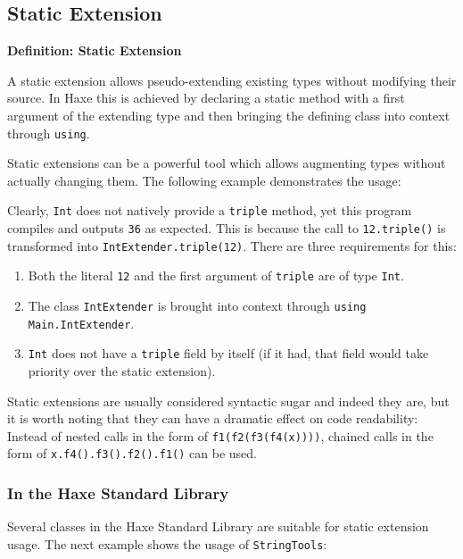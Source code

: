 \documentclass{article}
\newcommand{\type}[1]{\texttt{#1}}
\newcommand{\expr}[1]{\texttt{#1}}
\newenvironment{myshaded}
  {\def\FrameCommand{\fboxsep=\topsep\colorbox{bgcolor}}%
  \MakeFramed {\advance\hsize-\width \FrameRestore}}%
 {\endMakeFramed}
\newcommand{\define}[3][Definition]
	{\begin{myshaded}\noindent\textbf{#1: #2}\par\nobreak\noindent\ignorespaces#3\label{def:#2}\end{myshaded}}
\begin{document}
\subsection{Static Extension}
\label{Static Extension}

\define{Static Extension}{A static extension allows pseudo-extending existing types without modifying their source. In Haxe this is achieved by declaring a static method with a first argument of the extending type and then bringing the defining class into context through \expr{using}.}

Static extensions can be a powerful tool which allows augmenting types without actually changing them. The following example demonstrates the usage:



Clearly, \type{Int} does not natively provide a \expr{triple} method, yet this program compiles and outputs \expr{36} as expected. This is because the call to \expr{12.triple()} is transformed into \expr{IntExtender.triple(12)}. There are three requirements for this:

\begin{enumerate}
	\item Both the literal \expr{12} and the first argument of \expr{triple} are of type \type{Int}.
	\item The class \type{IntExtender} is brought into context through \expr{using Main.IntExtender}.
	\item \type{Int} does not have a \expr{triple} field by itself (if it had, that field would take priority over the static extension).
\end{enumerate}

Static extensions are usually considered syntactic sugar and indeed they are, but it is worth noting that they can have a dramatic effect on code readability: Instead of nested calls in the form of \expr{f1(f2(f3(f4(x))))}, chained calls in the form of \expr{x.f4().f3().f2().f1()} can be used.

\subsubsection{In the Haxe Standard Library}

Several classes in the Haxe Standard Library are suitable for static extension usage. The next example shows the usage of \type{StringTools}:


\end{document}
